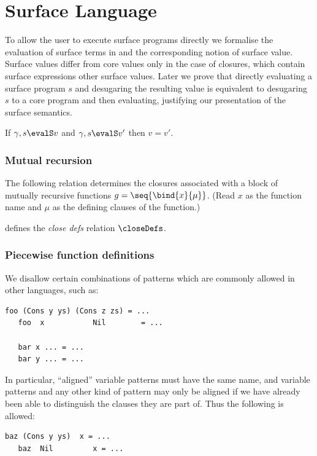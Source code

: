 \section{Surface Language}

To allow the user to execute surface programs directly we formalise the evaluation of surface terms in
 and the corresponding notion of surface value. Surface values differ from core
values only in the case of closures, which contain surface expressions other surface values. Later we prove
that directly evaluating a surface program $s$ and desugaring the resulting value is equivalent to desugaring
$s$ to a core program and then evaluating, justifying our presentation of the surface semantics.

\begin{lemma}[Determinism]
   \label{lem:baseline:surface:eval:determinism}
   If $\gamma, s \evalS v$ and $\gamma, s \evalS v'$ then $v = v'$.
\end{lemma}

\subsubsection{Mutual recursion}

The following relation determines the closures associated with a block of mutually recursive functions $g =
\seq{\bind{x}{\mu}}$. (Read $x$ as the function name and $\mu$ as the defining clauses of the function.)

\begin{definition}
   \label{def:baseline:surface:close-defs}
    defines the \emph{close defs} relation $\closeDefs$.
\end{definition}

\subsubsection{Piecewise function definitions}

We disallow certain combinations of patterns which are commonly allowed in other languages, such as:%
{\small
\begin{lstlisting}[language=Fluid]
   foo (Cons y ys) (Cons z zs) = ...
   foo  x           Nil        = ...

   bar x ... = ...
   bar y ... = ...
\end{lstlisting}}

\noindent In particular, ``aligned'' variable patterns must have the same name, and variable patterns and any other kind of pattern may only be aligned if we have already been able to distinguish the clauses they are part of. Thus the following is allowed:%
{\small
\begin{lstlisting}[language = Fluid]
   baz (Cons y ys)  x = ...
   baz  Nil         x = ...
\end{lstlisting}}

